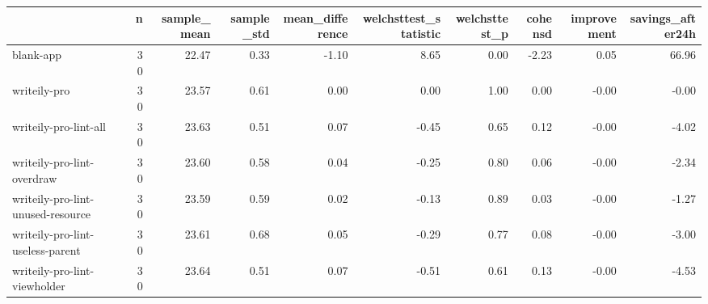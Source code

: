 \begin{tabular}{lrrrrrrrrr}
\toprule
{} &   n &  sample\_mean &  sample\_std &  mean\_difference &  welchsttest\_statistic &  welchsttest\_p &  cohensd &  improvement &  savings\_after24h \\
\midrule
blank-app                         &  30 &        22.47 &        0.33 &            -1.10 &                   8.65 &           0.00 &    -2.23 &         0.05 &             66.96 \\
writeily-pro                      &  30 &        23.57 &        0.61 &             0.00 &                   0.00 &           1.00 &     0.00 &        -0.00 &             -0.00 \\
writeily-pro-lint-all             &  30 &        23.63 &        0.51 &             0.07 &                  -0.45 &           0.65 &     0.12 &        -0.00 &             -4.02 \\
writeily-pro-lint-overdraw        &  30 &        23.60 &        0.58 &             0.04 &                  -0.25 &           0.80 &     0.06 &        -0.00 &             -2.34 \\
writeily-pro-lint-unused-resource &  30 &        23.59 &        0.59 &             0.02 &                  -0.13 &           0.89 &     0.03 &        -0.00 &             -1.27 \\
writeily-pro-lint-useless-parent  &  30 &        23.61 &        0.68 &             0.05 &                  -0.29 &           0.77 &     0.08 &        -0.00 &             -3.00 \\
writeily-pro-lint-viewholder      &  30 &        23.64 &        0.51 &             0.07 &                  -0.51 &           0.61 &     0.13 &        -0.00 &             -4.53 \\
\bottomrule
\end{tabular}
